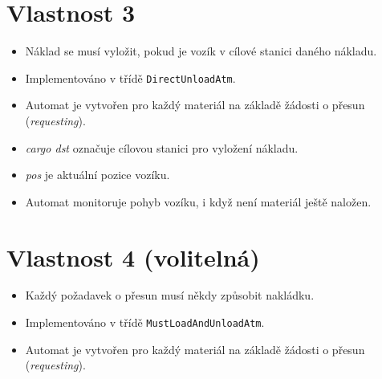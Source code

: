 \documentclass[a4paper, 11pt, fleqn]{scrartcl}
\begin{document}
  \section*{Vlastnost 3}
    \begin{itemize}[noitemsep]
      \item Náklad se musí vyložit, pokud je vozík v cílové stanici daného nákladu.
      \item Implementováno v třídě \texttt{DirectUnloadAtm}.
      \item Automat je vytvořen pro každý materiál na základě žádosti o přesun (\textit{requesting}).
      \item \textit{cargo dst} označuje cílovou stanici pro vyložení nákladu.
      \item \textit{pos} je aktuální pozice vozíku.
      \item Automat monitoruje pohyb vozíku, i když není materiál ještě naložen.
    \end{itemize}

    \begin{figure}[!h]
      \centering
    \end{figure}

  \newpage

  \section*{Vlastnost 4 (volitelná)}
    \begin{itemize}[noitemsep]
      \item Každý požadavek o přesun musí někdy způsobit nakládku.
      \item Implementováno v třídě \texttt{MustLoadAndUnloadAtm}.
      \item Automat je vytvořen pro každý materiál na základě žádosti o přesun (\textit{requesting}).
    \end{itemize}
\end{document}
